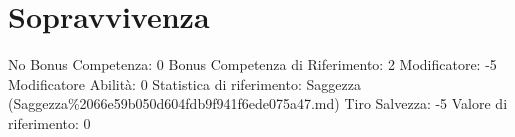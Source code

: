 \section{Sopravvivenza}\label{sopravvivenza}

\begin{description}
\tightlist
\item[Tags: ABI]
No Bonus Competenza: 0 Bonus Competenza di Riferimento: 2 Modificatore:
-5 Modificatore Abilità: 0 Statistica di riferimento: Saggezza
(Saggezza\%2066e59b050d604fdb9f941f6ede075a47.md) Tiro Salvezza: -5
Valore di riferimento: 0
\end{description}
